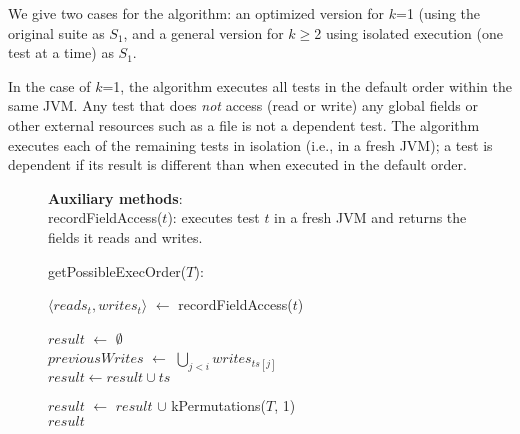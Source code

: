 We give two cases for the algorithm:  an optimized version for $k$=1 (using
the original suite as $S_1$, and
a general version for $k$$\ge$2 using isolated
execution (one test at a time) as $S_1$.

In the case of $k$=1, the algorithm executes all tests in the default order
within the same JVM\@.  Any test that does \textit{not}
access (read or write) any global fields or
other external resources such as a file
is not a dependent test. 
The algorithm executes each of the remaining tests in isolation (i.e., in a
fresh JVM); a test is dependent if its result is different than when
executed in the default order.

\begin{figure}[t]
\textbf{Auxiliary methods}:\\
recordFieldAccess($\mathit{t}$): executes test $\mathit{t}$ in
a fresh JVM and returns the fields it reads and writes.\\


\vspace{-2mm}

getPossibleExecOrder($T$):\\
\vspace{-5mm}
\begin{algorithmic}[1]
\STATE $\langle \mathit{reads}_t, \mathit{writes}_t\rangle$ $\leftarrow$ recordFieldAccess($\mathit{t}$)\\ 
\ENDFOR

\STATE $\mathit{result}$ $\leftarrow$ $\emptyset$ \\
		\STATE $\mathit{previousWrites}$ $\leftarrow$ $\bigcup_{\mathit{j} < \mathit{i}}  \mathit{writes}_{ts[j]} $ \\
			\STATE $\mathit{result} \leftarrow \mathit{result} \cup \mathit{ts}$
		\ENDIF
	\ENDFOR

\ENDFOR
\STATE $\mathit{result}$ $\leftarrow$ $\mathit{result}$ $\cup$ kPermutations($\mathit{T}$, 1)\\
\RETURN $\mathit{result}$
\end{algorithmic}


\end{figure}
